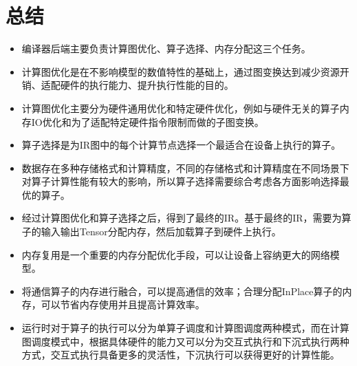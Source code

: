 \documentclass[letterpaper,10pt,english]{sphinxmanual}
\begin{document}
\section{总结}
\label{\detokenize{chapter_backend_and_runtime/summary:id1}}\label{\detokenize{chapter_backend_and_runtime/summary::doc}}\begin{itemize}
\item {} 
\sphinxAtStartPar
编译器后端主要负责计算图优化、算子选择、内存分配这三个任务。

\item {} 
\sphinxAtStartPar
计算图优化是在不影响模型的数值特性的基础上，通过图变换达到减少资源开销、适配硬件的执行能力、提升执行性能的目的。

\item {} 
\sphinxAtStartPar
计算图优化主要分为硬件通用优化和特定硬件优化，例如与硬件无关的算子内存IO优化和为了适配特定硬件指令限制而做的子图变换。

\item {} 
\sphinxAtStartPar
算子选择是为IR图中的每个计算节点选择一个最适合在设备上执行的算子。

\item {} 
\sphinxAtStartPar
数据存在多种存储格式和计算精度，不同的存储格式和计算精度在不同场景下对算子计算性能有较大的影响，所以算子选择需要综合考虑各方面影响选择最优的算子。

\item {} 
\sphinxAtStartPar
经过计算图优化和算子选择之后，得到了最终的IR。基于最终的IR，需要为算子的输入输出Tensor分配内存，然后加载算子到硬件上执行。

\item {} 
\sphinxAtStartPar
内存复用是一个重要的内存分配优化手段，可以让设备上容纳更大的网络模型。

\item {} 
\sphinxAtStartPar
将通信算子的内存进行融合，可以提高通信的效率；合理分配In\sphinxhyphen{}Place算子的内存，可以节省内存使用并且提高计算效率。

\item {} 
\sphinxAtStartPar
运行时对于算子的执行可以分为单算子调度和计算图调度两种模式，而在计算图调度模式中，根据具体硬件的能力又可以分为交互式执行和下沉式执行两种方式，交互式执行具备更多的灵活性，下沉执行可以获得更好的计算性能。

\end{itemize}
\end{document}
